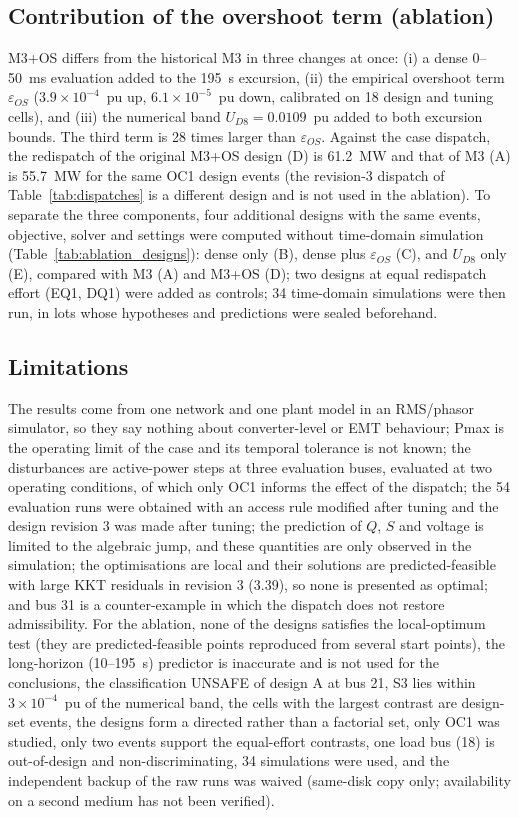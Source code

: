 \subsection{Contribution of the overshoot term (ablation)}
\label{sec:ablation}
M3+OS differs from the historical M3 in three changes at once: (i) a dense 0--50~ms evaluation added to the 195~s excursion, (ii) the empirical overshoot term $\varepsilon_{OS}$ ($3.9\times10^{-4}$~pu up, $6.1\times10^{-5}$~pu down, calibrated on 18 design and tuning cells), and (iii) the numerical band $U_{D8}=0.0109$~pu added to both excursion bounds. The third term is 28 times larger than $\varepsilon_{OS}$. Against the case dispatch, the redispatch of the original M3+OS design (D) is 61.2~MW and that of M3 (A) is 55.7~MW for the same OC1 design events (the revision-3 dispatch of Table~\ref{tab:dispatches} is a different design and is not used in the ablation). To separate the three components, four additional designs with the same events, objective, solver and settings were computed without time-domain simulation (Table~\ref{tab:ablation_designs}): dense only (B), dense plus $\varepsilon_{OS}$ (C), and $U_{D8}$ only (E), compared with M3 (A) and M3+OS (D); two designs at equal redispatch effort (EQ1, DQ1) were added as controls; 34 time-domain simulations were then run, in lots whose hypotheses and predictions were sealed beforehand.



\subsection{Limitations}
\label{sec:limitations}
The results come from one network and one plant model in an RMS/phasor simulator, so they say nothing about converter-level or EMT behaviour; Pmax is the operating limit of the case and its temporal tolerance is not known; the disturbances are active-power steps at three evaluation buses, evaluated at two operating conditions, of which only OC1 informs the effect of the dispatch; the 54 evaluation runs were obtained with an access rule modified after tuning and the design revision 3 was made after tuning; the prediction of $Q$, $S$ and voltage is limited to the algebraic jump, and these quantities are only observed in the simulation; the optimisations are local and their solutions are predicted-feasible with large KKT residuals in revision 3 (3.39), so none is presented as optimal; and bus 31 is a counter-example in which the dispatch does not restore admissibility. For the ablation, none of the designs satisfies the local-optimum test (they are predicted-feasible points reproduced from several start points), the long-horizon (10--195~s) predictor is inaccurate and is not used for the conclusions, the classification UNSAFE of design A at bus 21, S3 lies within $3\times10^{-4}$~pu of the numerical band, the cells with the largest contrast are design-set events, the designs form a directed rather than a factorial set, only OC1 was studied, only two events support the equal-effort contrasts, one load bus (18) is out-of-design and non-discriminating, 34 simulations were used, and the independent backup of the raw runs was waived (same-disk copy only; availability on a second medium has not been verified).
